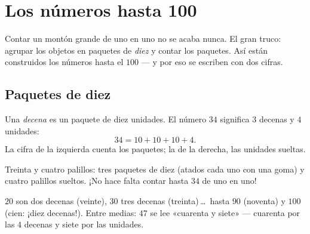 \chapter{Los números hasta 100}\label{ch:g1:tens}

Contar un montón grande de uno en uno no se acaba nunca. El gran truco:
agrupar los objetos en paquetes de \emph{diez} y contar los paquetes. Así
están construidos los números hasta el $100$ --- y por eso se
escriben con dos cifras.

\section{Paquetes de diez}

\begin{definition}\label{def:g1:tens:def}
Una \emph{decena} es un paquete de diez unidades. El número $34$ significa $3$
decenas y $4$ unidades:
\[
34 = 10 + 10 + 10 + 4 .
\]
La cifra de la izquierda cuenta los paquetes; la de la derecha, las unidades sueltas.
\end{definition}

\begin{omfigure}

{\small Treinta y cuatro palillos: tres paquetes de diez (atados cada uno
con una goma) y cuatro palillos sueltos. ¡No hace falta contar hasta $34$ de uno en uno!}
\end{omfigure}

\begin{example}\label{ex:g1:tens:reading}
$20$ son dos decenas (veinte), $30$ tres decenas (treinta)\,\dots\ hasta
$90$ (noventa) y $100$ (cien: ¡diez decenas!). Entre medias:
$47$ se lee «cuarenta y siete» --- cuarenta por las $4$ decenas y siete por
las unidades.
\end{example}

